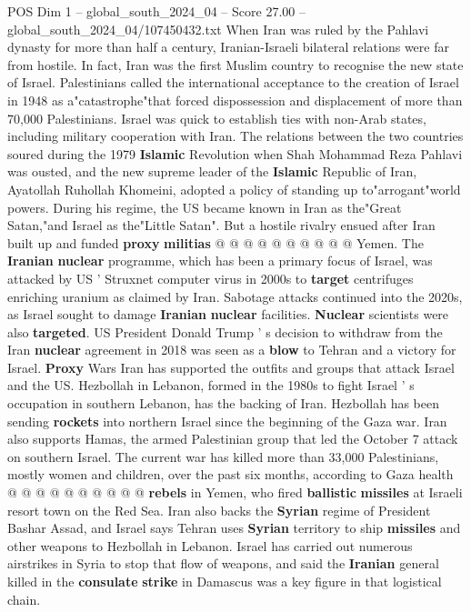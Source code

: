 \begin{textsample}{POS Dim 1 – global\_south\_2024\_04 – Score 27.00 – global\_south\_2024\_04/107450432.txt}
When Iran was ruled by the Pahlavi dynasty for more than half a century, Iranian-Israeli bilateral relations were far from hostile.
In fact, Iran was the first Muslim country to recognise the new state of Israel.
Palestinians called the international acceptance to the creation of Israel in 1948 as a"catastrophe"that forced dispossession and displacement of more than 70,000 Palestinians.
Israel was quick to establish ties with non-Arab states, including military cooperation with Iran.
The relations between the two countries soured during the 1979 \textbf{Islamic} Revolution when Shah Mohammad Reza Pahlavi was ousted, and the new supreme leader of the \textbf{Islamic} Republic of Iran, Ayatollah Ruhollah Khomeini, adopted a policy of standing up to"arrogant"world powers.
During his regime, the US became known in Iran as the"Great Satan,"and Israel as the"Little Satan".
But a hostile rivalry ensued after Iran built up and funded \textbf{proxy} \textbf{militias} @ @ @ @ @ @ @ @ @ @ Yemen.
The \textbf{Iranian} \textbf{nuclear} programme, which has been a primary focus of Israel, was attacked by US ' Struxnet computer virus in 2000s to \textbf{target} centrifuges enriching uranium as claimed by Iran.
Sabotage attacks continued into the 2020s, as Israel sought to damage \textbf{Iranian} \textbf{nuclear} facilities. \textbf{Nuclear} scientists were also \textbf{targeted}.
US President Donald Trump ' s decision to withdraw from the Iran \textbf{nuclear} agreement in 2018 was seen as a \textbf{blow} to Tehran and a victory for Israel. \textbf{Proxy} Wars Iran has supported the outfits and groups that attack Israel and the US.
Hezbollah in Lebanon, formed in the 1980s to fight Israel ' s occupation in southern Lebanon, has the backing of Iran.
Hezbollah has been sending \textbf{rockets} into northern Israel since the beginning of the Gaza war.
Iran also supports Hamas, the armed Palestinian group that led the October 7 attack on southern Israel.
The current war has killed more than 33,000 Palestinians, mostly women and children, over the past six months, according to Gaza health @ @ @ @ @ @ @ @ @ @ \textbf{rebels} in Yemen, who fired \textbf{ballistic} \textbf{missiles} at Israeli resort town on the Red Sea.
Iran also backs the \textbf{Syrian} regime of President Bashar Assad, and Israel says Tehran uses \textbf{Syrian} territory to ship \textbf{missiles} and other weapons to Hezbollah in Lebanon.
Israel has carried out numerous airstrikes in Syria to stop that flow of weapons, and said the \textbf{Iranian} general killed in the \textbf{consulate} \textbf{strike} in Damascus was a key figure in that logistical chain.

\end{textsample}

